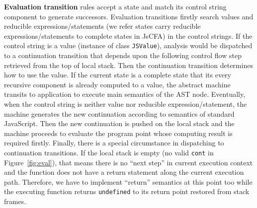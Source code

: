 \documentclass{article}
\begin{document}
\textbf{Evaluation transition} rules accept a state and match its control string component to generate successors. Evaluation transitions firstly search values and reducible expressions/statements (we refer states carry reducible expressions/statements to complete states in JsCFA) in the control strings.
If the control string is a value (instance of class \verb|JSValue|), analysis would be dispatched to a continuation transition that depends upon  the following control flow step retrieved from the top of local stack. Then the continuation transition determines how to use the value.
If the current state is a complete state that its every recursive component is already computed to a value, the abstract machine transits to application to execute main semantics of the AST node.
Eventually, when the control string is neither value nor reducible expression/statement, the machine generates the new continuation according to semantics of standard JavaScript.
Then the new continuation is pushed on the local stack and the machine proceeds to evaluate the program point whose computing result is required firstly.
Finally, there is a special circumstance in dispatching to continuation transitions. If the local stack is empty (no valid \verb|cont| in Figure~\ref{fig:eval}), that means there is no ``next step'' in current execution context and the function does not have a return statement along the current execution path.
Therefore, we have to implement ``return'' semantics at this point too while the executing function returns \verb|undefined| to its return point restored from stack frames.
\end{document}
